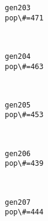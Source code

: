 \documentclass[11pt]{article}
\begin{document}
    \begin{Verbatim}[commandchars=\\\{\}]
gen203
pop\#=471

    \end{Verbatim}

    \begin{center}
    \end{center}
    { \hspace*{\fill} \\}
    
    \begin{Verbatim}[commandchars=\\\{\}]
gen204
pop\#=463

    \end{Verbatim}

    \begin{center}
    \end{center}
    { \hspace*{\fill} \\}
    
    \begin{Verbatim}[commandchars=\\\{\}]
gen205
pop\#=453

    \end{Verbatim}

    \begin{center}
    \end{center}
    { \hspace*{\fill} \\}
    
    \begin{Verbatim}[commandchars=\\\{\}]
gen206
pop\#=439

    \end{Verbatim}

    \begin{center}
    \end{center}
    { \hspace*{\fill} \\}
    
    \begin{Verbatim}[commandchars=\\\{\}]
gen207
pop\#=444

    \end{Verbatim}
\end{document}
